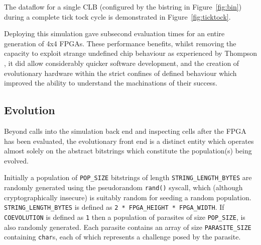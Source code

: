 The dataflow for a single CLB (configured
by the bistring in Figure~\ref{fig:bin}) during a complete tick tock cycle is demonstrated
in Figure~\ref{fig:ticktock}.

Deploying this simulation gave subsecond evaluation times for an entire generation of
4x4 FPGAs. These performance benefits, whilst removing the capacity to exploit
strange undefined chip behaviour as experienced by Thompson \cite{10.1007/3-540-63173-9_61},
it did allow considerably quicker software development, and the creation of
evolutionary hardware within the strict confines of defined behaviour which
improved the ability to understand the machinations of their success.

\subsection{Evolution}
Beyond calls into the simulation back end and inspecting cells after the FPGA
has been evaluated, the evolutionary front end is a distinct entity which operates
almost solely on the abstract bitstrings which constitute the population(s)
being evolved.

Initially a population of \texttt{POP\_SIZE} bitstrings of length \texttt{STRING\_LENGTH\_BYTES}
are randomly generated using the pseudorandom \texttt{rand()} syscall, which
(although cryptographically insecure) is suitably random for seeding a random
population. \texttt{STRING\_LENGTH\_BYTES} is defined as \texttt{2 * FPGA\_HEIGHT * FPGA\_WIDTH}.
If \texttt{COEVOLUTION} is defined as \texttt{1} then a population of
parasites of size \texttt{POP\_SIZE}, is also randomly generated. Each parasite
contains an array of size \texttt{PARASITE\_SIZE} containing \texttt{char}s, each of which represents a
challenge posed by the parasite.

